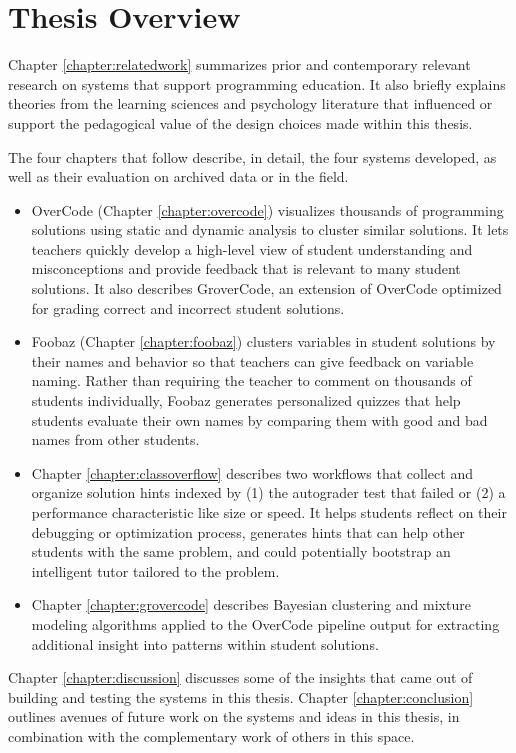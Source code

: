 \section{Thesis Overview}

Chapter \ref{chapter:relatedwork} summarizes prior and contemporary relevant research on systems that support programming education. It also briefly explains theories from the learning sciences and psychology literature that influenced or support the pedagogical value of the design choices made within this thesis.

The four chapters that follow describe, in detail, the four systems developed, as well as their evaluation on archived data or in the field.

\begin{itemize}
\item OverCode (Chapter \ref{chapter:overcode}) visualizes thousands of programming solutions using static and dynamic analysis to cluster similar solutions. It lets teachers quickly develop a high-level view of student understanding and misconceptions and provide feedback that is relevant to many student solutions. It also describes GroverCode, an extension of OverCode optimized for grading correct and incorrect student solutions.

\item Foobaz (Chapter \ref{chapter:foobaz}) clusters variables in student solutions by their names and behavior so that teachers can give feedback on variable naming. Rather than requiring the teacher to comment on thousands of students individually, Foobaz generates personalized quizzes that help students evaluate their own names by comparing them with good and bad names from other students. 

\item Chapter \ref{chapter:classoverflow} describes two workflows that collect and organize solution hints indexed by (1) the autograder test that failed or (2) a performance characteristic like size or speed. It helps students reflect on their debugging or optimization process, generates hints that can help other students with the same problem, and could potentially bootstrap an intelligent tutor tailored to the problem.

\item Chapter \ref{chapter:grovercode} describes Bayesian clustering and mixture modeling algorithms applied to the OverCode pipeline output for extracting additional insight into patterns within student solutions. 
\end{itemize}

Chapter \ref{chapter:discussion} discusses some of the insights that came out of building and testing the systems in this thesis. Chapter \ref{chapter:conclusion} outlines avenues of future work on the systems and ideas in this thesis, in combination with the complementary work of others in this space.